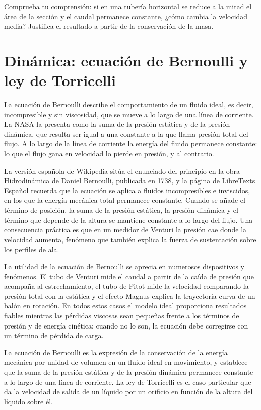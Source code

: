 \documentclass{book}
\begin{document}
\begin{tcolorbox}[title={Autoficha}, studiumcheck, breakable]

Comprueba tu comprensión: si en una tubería horizontal se reduce a la mitad el área de la sección y el caudal permanece constante, ¿cómo cambia la velocidad media? Justifica el resultado a partir de la conservación de la masa.
\end{tcolorbox}

\chapter{Dinámica: ecuación de Bernoulli y ley de Torricelli}

La ecuación de Bernoulli describe el comportamiento de un fluido ideal, es decir, incompresible y sin viscosidad, que se mueve a lo largo de una línea de corriente. La NASA la presenta como la suma de la presión estática y de la presión dinámica, que resulta ser igual a una constante a la que llama presión total del flujo. A lo largo de la línea de corriente la energía del fluido permanece constante: lo que el flujo gana en velocidad lo pierde en presión, y al contrario.

La versión española de Wikipedia sitúa el enunciado del principio en la obra Hidrodinámica de Daniel Bernoulli, publicada en 1738, y la página de LibreTexts Español recuerda que la ecuación se aplica a fluidos incompresibles e inviscidos, en los que la energía mecánica total permanece constante. Cuando se añade el término de posición, la suma de la presión estática, la presión dinámica y el término que depende de la altura se mantiene constante a lo largo del flujo. Una consecuencia práctica es que en un medidor de Venturi la presión cae donde la velocidad aumenta, fenómeno que también explica la fuerza de sustentación sobre los perfiles de ala.

La utilidad de la ecuación de Bernoulli se aprecia en numerosos dispositivos y fenómenos. El tubo de Venturi mide el caudal a partir de la caída de presión que acompaña al estrechamiento, el tubo de Pitot mide la velocidad comparando la presión total con la estática y el efecto Magnus explica la trayectoria curva de un balón en rotación. En todos estos casos el modelo ideal proporciona resultados fiables mientras las pérdidas viscosas sean pequeñas frente a los términos de presión y de energía cinética; cuando no lo son, la ecuación debe corregirse con un término de pérdida de carga.

\begin{tcolorbox}[title={Definición}, studiumdef, breakable]

La ecuación de Bernoulli es la expresión de la conservación de la energía mecánica por unidad de volumen en un fluido ideal en movimiento, y establece que la suma de la presión estática y de la presión dinámica permanece constante a lo largo de una línea de corriente. La ley de Torricelli es el caso particular que da la velocidad de salida de un líquido por un orificio en función de la altura del líquido sobre él.
\end{tcolorbox}
\end{document}
